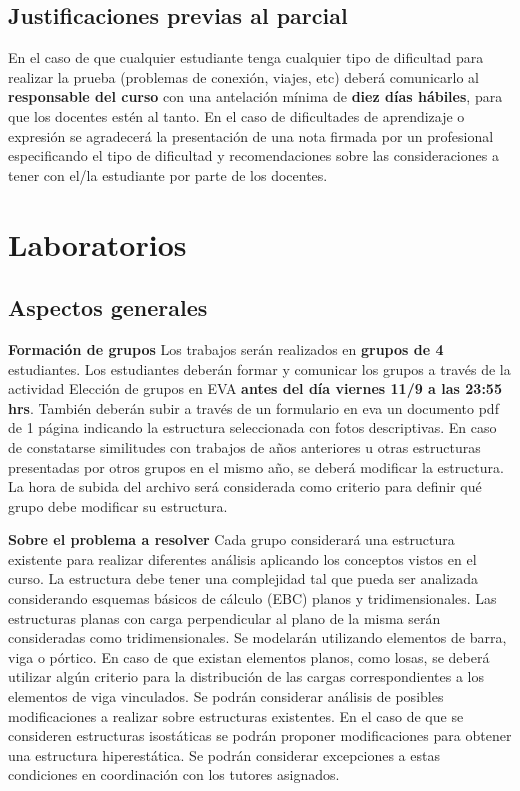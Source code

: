 \documentclass[a4paper,11pt,twocolumn]{article}
\begin{document}
\subsection{Justificaciones previas al parcial} \label{sec:justif}

En el caso de que cualquier estudiante tenga cualquier tipo de dificultad para realizar la prueba (problemas de conexión, viajes, etc) deberá comunicarlo al \textbf{responsable del curso} con una antelación mínima de \textbf{diez días hábiles}, para que los docentes estén al tanto. En el caso de dificultades de aprendizaje o expresión se agradecerá la presentación de una nota firmada por un profesional especificando el tipo de dificultad y recomendaciones sobre las consideraciones a tener con el/la estudiante por parte de los docentes.

\section{Laboratorios}

\subsection{Aspectos generales}

\textbf{Formación de grupos}
Los trabajos serán realizados en \textbf{grupos de 4} estudiantes. Los estudiantes deberán formar y comunicar los grupos a través de la actividad Elección de grupos en EVA \textbf{antes del día viernes 11/9 a las 23:55 hrs}. %
%
También deberán subir a través de un formulario en eva un documento pdf de 1 página indicando la estructura seleccionada con fotos descriptivas. En caso de constatarse similitudes con trabajos de años anteriores u otras estructuras presentadas por otros grupos en el mismo año, se deberá modificar la estructura. La hora de subida del archivo será considerada como criterio para definir qué grupo debe modificar su estructura.

\vspace{5mm}

\textbf{Sobre el problema a resolver}
Cada grupo considerará una estructura existente para realizar diferentes análisis aplicando los conceptos vistos en el curso. %
%
La estructura debe tener una complejidad tal que pueda ser analizada considerando esquemas básicos de cálculo (EBC) planos y tridimensionales. Las estructuras planas con carga perpendicular al plano de la misma serán consideradas como tridimensionales. %
%
Se modelarán utilizando elementos de barra, viga o pórtico. %
En caso de que existan elementos planos, como losas, se deberá utilizar algún criterio para la distribución de las cargas correspondientes a los elementos de viga vinculados.
%
Se podrán considerar análisis de posibles modificaciones a realizar sobre estructuras existentes. %
%
En el caso de que se consideren estructuras isostáticas se podrán proponer modificaciones para obtener una estructura hiperestática. Se podrán considerar excepciones a estas condiciones en coordinación con los tutores asignados.
\end{document}
